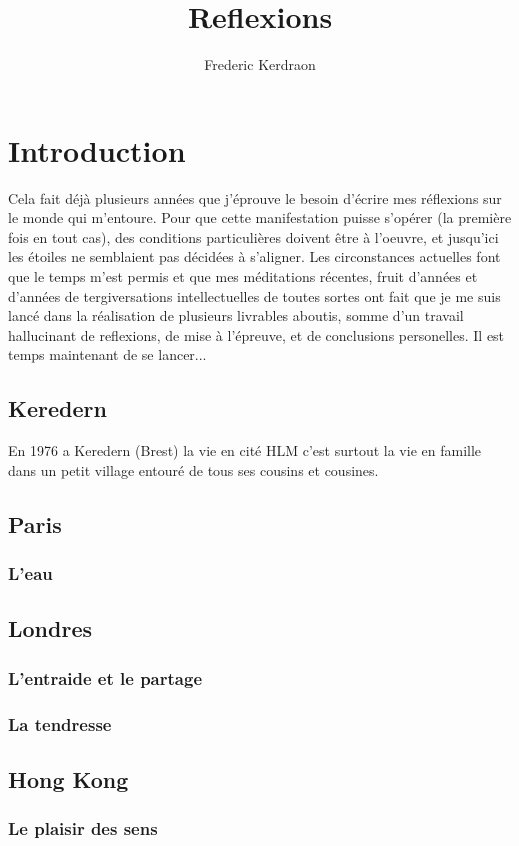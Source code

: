 \documentclass[11pt]{article} %
\title{Reflexions}
\author{Frederic Kerdraon}
\begin{document}
\maketitle

\section{Introduction}

Cela fait déjà plusieurs années que j'éprouve le besoin d'écrire mes réflexions sur le monde qui m'entoure.
Pour que cette manifestation puisse s'opérer (la première fois en tout cas), des conditions particulières doivent être à l'oeuvre, et jusqu'ici les étoiles ne semblaient pas décidées à s'aligner.
Les circonstances actuelles font que le temps m'est permis et que mes méditations récentes, fruit d'années et d'années de tergiversations intellectuelles de toutes sortes ont fait que je me suis lancé dans la réalisation de plusieurs livrables aboutis, somme d'un travail hallucinant de reflexions, de mise à l'épreuve, et de conclusions personelles.
Il est temps maintenant de se lancer...
\subsection{Keredern}
En 1976 a Keredern (Brest) la vie en cité HLM c'est surtout la vie en famille dans un petit village entouré de tous ses cousins et cousines.
\subsection{Paris}
\subsubsection{L'eau}

\subsection{Londres}
\subsubsection{L'entraide et le partage}
\subsubsection{La tendresse}

\subsection{Hong Kong}
\subsubsection{Le plaisir des sens}
\end{document}
